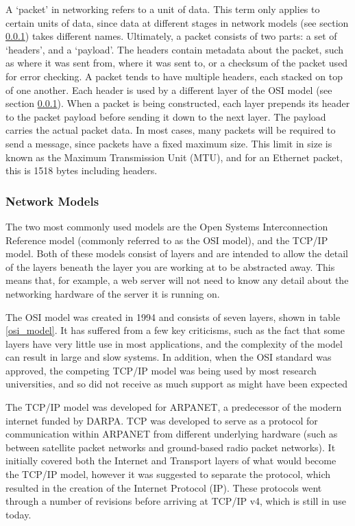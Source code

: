 \documentclass[12pt, a4paper, twoside, onecolumn]{article}
\begin{document}
A `packet' in networking refers to a unit of data. This term only applies to certain units of data, since data at different stages in network models (see section \ref{network_models}) takes different names. Ultimately, a packet consists of two parts: a set of `headers', and a `payload'. The headers contain metadata about the packet, such as where it was sent from, where it was sent to, or a checksum of the packet used for error checking. A packet tends to have multiple headers, each stacked on top of one another. Each header is used by a different layer of the OSI model (see section \ref{network_models}). When a packet is being constructed, each layer prepends its header to the packet payload before sending it down to the next layer. The payload carries the actual packet data. In most cases, many packets will be required to send a message, since packets have a fixed maximum size. This limit in size is known as the Maximum Transmission Unit (MTU), and for an Ethernet packet, this is 1518 bytes including headers.

\subsubsection{Network Models}
\label{network_models}
The two most commonly used models are the Open Systems Interconnection Reference model (commonly referred to as the OSI model), and the TCP/IP model. Both of these models consist of layers and are intended to allow the detail of the layers beneath the layer you are working at to be abstracted away. This means that, for example, a web server will not need to know any detail about the networking hardware of the server it is running on.

The OSI model was created in 1994 \cite{iec7498_1_1994} and consists of seven layers, shown in table \ref{osi_model}. It has suffered from a few key criticisms, such as the fact that some layers have very little use in most applications, and the complexity of the model can result in large and slow systems. In addition, when the OSI standard was approved, the competing TCP/IP model was being used by most research universities, and so did not receive as much support as might have been expected

The TCP/IP model was developed for ARPANET, a predecessor of the modern internet funded by DARPA. TCP was developed to serve as a protocol for communication within ARPANET from different underlying hardware (such as between satellite packet networks and ground-based radio packet networks). It initially covered both the Internet and Transport layers of what would become the TCP/IP model, however it was suggested to separate the protocol, which resulted in the creation of the Internet Protocol (IP). These protocols went through a number of revisions before arriving at TCP/IP v4, which is still in use today.
\end{document}
